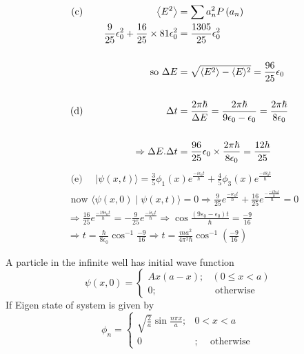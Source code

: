 \begin{enumerate}
\begin{answer}
\begin{align*}
	\text{(c) }\hspace{2.5cm}\left\langle E^{2}\right\rangle&=\sum a_{n}^{2} P\left(a_{n}\right)\\
	\frac{9}{25} \epsilon_{0}^{2}+\frac{16}{25} \times 81 \epsilon_{0}^{2}&=\frac{1305}{25} \epsilon_{0}^{2} \\\\
	\text{so }\Delta E&=\sqrt{\left\langle E^{2}\right\rangle-\langle E\rangle^{2}}=\frac{96}{25} \epsilon_{0}\\\\
	\text{(d) }\hspace{2.9cm}\Delta t&=\frac{2 \pi \hbar}{\Delta E}=\frac{2 \pi \hbar}{9 \epsilon_{0}-\epsilon_{0}}=\frac{2 \pi \hbar}{8 \epsilon_{0}}\\\\
	\Rightarrow \Delta E . \Delta t&=\frac{96}{25} \epsilon_{0} \times \frac{2 \pi \hbar}{8 \epsilon_{0}}=\frac{12 h}{25}
	\end{align*}
	\begin{align*}
		&\text { (e) }\quad |\psi(x, t)\rangle=\frac{3}{5} \phi_{1}(x) e^{\frac{-i \epsilon_{0} t}{\hbar}}+\frac{4}{5} \phi_{3}(x) e^{\frac{-i \theta_{0} t}{\hbar}} \\
		&\text { now }\langle\psi(x, 0) \mid \psi(x, t)\rangle=0 \Rightarrow \frac{9}{25} e^{\frac{-i \epsilon_{0} t}{\hbar}}+\frac{16}{25} e^{\frac{-\frac{-19 \epsilon_{0} t}{\hbar}}{\hbar}}=0 \\
		&\Rightarrow \frac{16}{25} e^{\frac{-19 \epsilon_{0} t}{h}}=-\frac{9}{25} e^{\frac{-i \epsilon_{0} t}{\hbar}} \Rightarrow \cos \frac{\left(9 \varepsilon_{0}-\epsilon_{0}\right) t}{\hbar}=\frac{-9}{16} \\
		&\Rightarrow t=\frac{\hbar}{8 \epsilon_{0}} \cos ^{-1} \frac{-9}{16} \Rightarrow t=\frac{m a^{2}}{4 \pi^{2} \hbar} \cos ^{-1}\left(\frac{-9}{16}\right)
	\end{align*}
\end{answer}
	\begin{minipage}{\textwidth}
	\item A particle in the infinite well has initial wave function
	$$
	\psi(x, 0)= \begin{cases}A x(a-x) ; & (0 \leq x<a) \\ 0 ; & \text { otherwise }\end{cases}
	$$
	If Eigen state of system is given by
	$$
	\phi_{n}= \begin{cases}\sqrt{\frac{2}{a}} \sin \frac{n \pi x}{a} ; & 0<x<a \\ 0 & ; \quad \text { otherwise }\end{cases}
$$
\end{minipage}
\end{enumerate}

